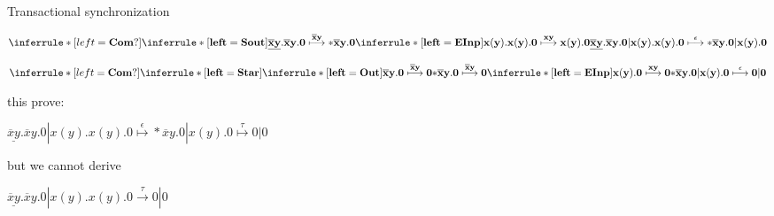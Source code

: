 \begin{example}Transactional synchronization
  \begin{center}
    $\inferrule*[left=\bf{Com?}]{
      \inferrule*[left=\bf{Sout}]{
      }{
	\underline{\overline{x}y}.\overline{x}y.0 
	  \stackrel{\overline{x}y}{\longmapsto}
	    *\overline{x}y.0
      } 
    \\
      \inferrule*[left=\bf{EInp}]{	
      }{
	x(y).x(y).0
	  \stackrel{xy}{\longmapsto}
	    x(y).0
      }
    }{
      \underline{\overline{x}y}.\overline{x}y.0 | x(y).x(y).0
	\stackrel{\epsilon}{\longmapsto}
	  *\overline{x}y.0 | x(y).0
    }$
  \end{center}
  \begin{center}
    $\inferrule*[left=\bf{Com?}]{
      \inferrule*[left=\bf{Star}]{
	\inferrule*[left=\bf{Out}]{
	}{
	  \overline{x}y.0 
	    \stackrel{\overline{x}y}{\longmapsto}
	      0
	} 
      }{
	  *\overline{x}y.0 
	    \stackrel{\overline{x}y}{\longmapsto}
	      0
      }
    \\
      \inferrule*[left=\bf{EInp}]{	
      }{
	x(y).0
	  \stackrel{xy}{\longmapsto}
	    0
      }
    }{
      *\overline{x}y.0 | x(y).0
	\stackrel{\epsilon}{\longmapsto}
	  0 | 0
    }$
  \end{center}
  this prove:
  \begin{center}
    $\underline{\overline{x}y}.\overline{x}y.0 | x(y).x(y).0
	\stackrel{\epsilon}{\longmapsto}
	  *\overline{x}y.0 | x(y).0
	    \stackrel{\tau}{\longmapsto}
	      0 | 0$
  \end{center}
  but we cannot derive 
  \begin{center}
    $\underline{\overline{x}y}.\overline{x}y.0 | x(y).x(y).0
      \xrightarrow{\tau}
	0 | 0$
  \end{center}
\end{example}


